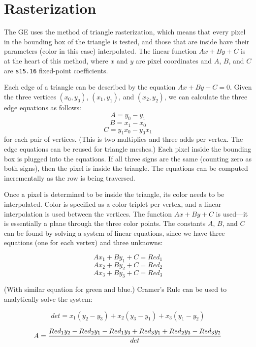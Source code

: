 \documentclass{book}
\begin{document}


\chapter{Rasterization}


The GE uses the 
method of triangle rasterization, which means that every pixel in the
bounding box of the triangle is tested, and those that are inside have
their parameters (color in this case) interpolated.  The linear
function $Ax + By + C$ is at the heart of this method, where $x$ and
$y$ are pixel coordinates and $A$, $B$, and $C$ are {\tt s15.16}
fixed-point coefficients.


Each edge of a triangle can be described by the equation $Ax + By + C = 0$.
Given the three vertices $(x_0,y_0)$, $(x_1,y_1)$, and $(x_2,y_2)$, we
can calculate the three edge equations as follows:
$$A = y_0 - y_1$$
$$B = x_1 - x_0$$
$$C = y_1x_0 - y_0x_1$$
for each pair of vertices.  (This is two multiplies and three adds per
vertex.  The edge equations can be reused for triangle meshes.)  Each
pixel inside the bounding box is plugged into the equations.  If all
three signs are the same (counting zero as both signs), then the pixel
is inside the triangle.  The equations can be computed incrementally
as the row is being traversed.


Once a pixel is determined to be inside the triangle, its color needs
to be interpolated.  Color is specified as a color triplet per vertex,
and a linear interpolation is used between the vertices.  The function
$Ax + By + C$ is used---it is essentially a plane through the three
color points.  The constants $A$, $B$, and $C$ can be found by solving a
system of linear equations, since we have three equations (one for each
vertex) and three unknowns:

$$Ax_1 + By_1 + C = Red_1$$
$$Ax_2 + By_2 + C = Red_2$$
$$Ax_3 + By_3 + C = Red_3$$

(With similar equation for green and blue.)  Cramer's Rule can be used to
analytically solve the system:

$$det = x_1(y_2-y_3) + x_2(y_3 -y_1) + x_3(y_1 - y_2)$$

$$A = {Red_1  y_2 - Red_2  y_1 - Red_1  y_3 + Red_3  y_1 +
        Red_2  y_3 - Red_3  y_2 \over det}$$
\end{document}
